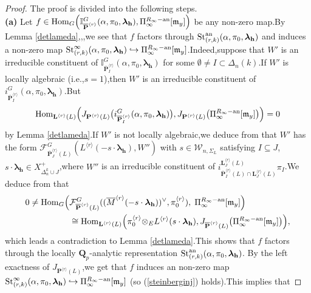 \documentclass[SecEq,CM,GP]{degruyter-crelle} %
\theoremstyle{plain}
\newcommand{\ana}{{\rm an}}
\newcommand{\homo}{{\rm Hom}}
\newcommand{\lrr}{{\langle r\rangle}}
\newcommand{\op}{{\overline{{\mathbf{P}}}}}
\newcommand{\st}{{\rm St}}
\newcommand{\te}{{\otimes_E}}
\newcommand{\BI}{{\mathbb{I}}}
\newcommand{\bL}{{\mathbf{L}}}
\newcommand{\bP}{{\mathbf{P}}}
\newcommand{\bQ}{{\mathbf{Q}}}
\newcommand{\bh}{{\mathbf{h}}}
\newcommand{\fm}{{\mathfrak{m}}}
\newcommand{\sW}{\mathscr W}
\begin{document}
\begin{proof}The proof is divided into the following steps.\;\\
\textbf{(a)} Let $f\in \homo_{G}\Big(\BI_{\op^{\lrr}}^G(\alpha,\pi_0,{\bm\lambda}_\bh), \Pi_{\infty}^{R_{\infty}-\ana}[\fm_y]\Big)$ be any non-zero map.\;By Lemma \ref{detlameda},\;\cite[Theorem 4.3]{breuil2015II},\;\cite[Corollary 3.4]{breuil2016socle},\;we see that $f$  factors through $\st^{\ana}_{(r,k)}(\alpha,\pi_0,{\bm\lambda}_\bh)$ and induces a non-zero map $\st^{\infty}_{(r,k)}(\alpha,\pi_0,{\bm\lambda}_\bh)\hookrightarrow \Pi_{\infty}^{R_{\infty}-\ana}[\fm_y]$.\;Indeed,\;suppose that $W'$ is an irreducible constituent of $\BI_{\op^{\lrr}_I}^G(\alpha,\pi_0,{\bm\lambda}_\bh)$ for some $\emptyset\neq I\subset \Delta_n(k)$.\;If $W'$ is locally algebraic (i.e.,\;$s=1$),\;then $W'$ is an irreducible constituent of $i_{\op^{\lrr}_{I}}^G(\alpha,\pi_0,\bm{\lambda}_\bh)$.\;But $$\homo_{\bL^{\lrr}(L)}\Big( J_{\bP^{\lrr}(L)}\big(i_{\op^{\lrr}_{{I}}}^G(\alpha,\pi_0,{\bm\lambda}_\bh)\big), J_{\bP^{\lrr}(L)}\big(\Pi_{\infty}^{R_{\infty}-\ana}[\fm_y]\big)\Big)=0$$
by Lemma \ref{detlameda}.\;If $W'$ is not locally algebraic,\;we deduce from  \cite[Theorem]{orlik2014jordan} that $W'$ has the form $\mathcal{F}_{\op_J^{\lrr}(L)}^G(L^{\lrr}(-s\cdot{\bm\lambda}_\bh),W'')$
with $s\in \sW_{n,\Sigma_{L}}$ satisfying $I\subseteq J$,\;$s\cdot{\bm\lambda}_\bh\in X^+_{\Delta_n^k\cup J}$,\;where $W''$ is an irreducible  constituent of $i_{\op_I^{\lrr}(L)\cap\bL^{\lrr}_J(L) }^{\bL^{\lrr}_J(L)}\pi_I$.\;We deduce from \cite[Th\'{e}or\`{e}me 4.3,\;Remarque 4.4 (i),\;Corollaire 4.5]{breuil2015II} that
\begin{equation}
	\begin{aligned}
		0\neq \homo_{G}\Big(&\mathcal{F}_{\op^{\lrr}(L)}^G((\overline{M}^{\lrr}(-s\cdot{\bm\lambda}_\bh))^\vee,\pi_0^{\lrr}),\;\Pi_{\infty}^{R_{\infty}-\ana}[\fm_y]\Big)\\
		&\cong \homo_{\bL^{\lrr}(L)}\Big(\pi_0^{\lrr}\te L^{\lrr}(s\cdot{\bm\lambda}_\bh), J_{\op^{\lrr}(L)}\big(\Pi_{\infty}^{R_{\infty}-\ana}[\fm_y]\big)\Big),
	\end{aligned}
\end{equation}
which leads a contradiction to Lemma \ref{detlameda}.\;This shows that $f$ factors through the locally $\bQ_p$-analytic representation $\st^{\ana}_{(r,k)}(\alpha,\pi_0,{\bm\lambda}_\bh)$. By the left exactness of $J_{\bP^{\lrr}(L)}$,\;we get that $f$ induces an non-zero map $\st^{\infty}_{(r,k)}(\alpha,\pi_0,{\bm\lambda}_\bh)\hookrightarrow \Pi_{\infty}^{R_{\infty}-\ana}[\fm_y]$ (so (\ref{steinberginj}) holds).\;This implies that

\end{proof}
\end{document}
